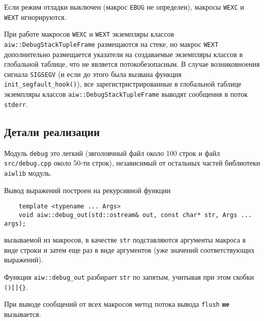 Если режим отладки выключен (макрос \verb'EBUG' не определен), макросы \verb'WEXC' и \verb'WEXT' игнорируются.

При работе макросов \verb'WEXC' и \verb'WEXT' экземпляры классов  \verb'aiw::DebugStackTupleFrame' размещаются на стеке, но
макрос \verb'WEXT' дополнительно размещается указатели на создаваемые экземпляры классов в глобальной таблице, что не является потокобезопасным. 
В случае возниковноения сигнала \verb'SIGSEGV' (и если до этого была вызвана функция \verb'init_segfault_hook()'),
все зарегистристрированные в глобальной таблице экземпляры классов \verb'aiw::DebugStackTupleFrame' выводят сообщения в поток \verb'stderr'.

\subsection{Детали реализации}
Модуль \verb'debug' это легкий (звголовчный файл около 100 строк и файл \verb'src/debug.cpp' около 50-ти строк),
независимый от остальных частей библиотеки \verb'aiwlib' модуль.

Вывод выражений построен на рекурсивной функции
\begin{verbatim}
    template <typename ... Args> 
    void aiw::debug_out(std::ostream& out, const char* str, Args ... args);
\end{verbatim}
вызываемой из макросов, в качестве \verb'str' подставляются аргументы макроса в виде строки и затем еще раз
в виде аргументов (уже значений соответствующих выражений). 

Функция \verb'aiw::debug_out' разбирает \verb'str' по запятым, учитывая при этом скобки \verb'()[]{}'.


При выводе сообщений от всех макросов метод потока вывода \verb'flush' {\bf не} вызывается. 

\endinput
Модуль \verb'debug' подключает и использует следующие стандартные библиотеки:
\begin{itemize}
\item \verb'<cerrno>', \verb'<cstring>' --- доступ к глобальной переменной \verb'errno' и функциии \verb'strerror(errno)';  
\item \verb'<iostream>' --- работа со стандартными потоками вывода;
\item \verb'<sstream>' --- работа с потоком \verb'std::stringstream' в макросах \verb'WEXC';
\item \verb'<exception>' --- определение наличия исключительной ситуации в деструкторе объекта \verb'aiw::DebugStackFrame'
  при помощи фунцкии \verb'std::uncaught_exception()'.
\end{itemize}


 
